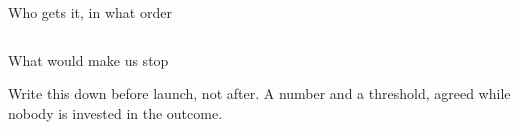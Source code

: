 
\begin{frame}{Who gets it, in what order}
  \begin{columns}[T]
  \end{columns}
\end{frame}

\begin{frame}{What would make us stop}
  \begin{glass}
  Write this down before launch, not after. A number and a threshold, agreed while nobody is
  invested in the outcome.
  \end{glass}
\end{frame}
